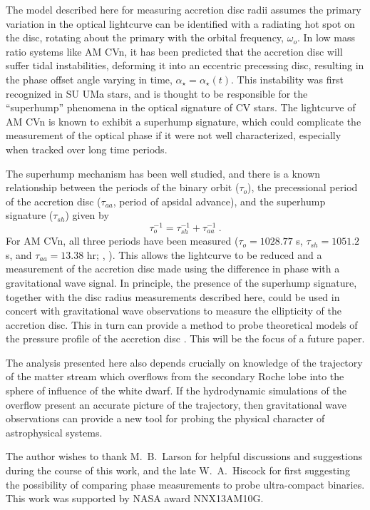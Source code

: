 \documentclass[preprint2]{aastex}
\begin{document}
The model described here for measuring accretion disc radii assumes
the primary variation in the optical lightcurve can be identified
with a radiating hot spot on the disc, rotating about the primary with
the orbital frequency, $\omega_{o}$.  In low mass ratio systems like
AM CVn, it has been predicted that the accretion disc will suffer
tidal instabilities, deforming it into an eccentric precessing disc,
resulting in the phase offset angle varying in time, $\alpha_\star =
\alpha_\star(t)$.  This instability was first recognized in SU UMa stars,
and is thought to be responsible for the ``superhump'' phenomena in
the optical signature of CV stars.  The lightcurve of AM CVn is known
to exhibit a superhump signature, which could complicate the
measurement of the optical phase if it were not well characterized,
especially when tracked over long time periods.

The superhump mechanism has been well studied, and there is a known 
relationship between the periods of the binary orbit ($\tau_{o}$), the 
precessional period of the accretion disc ($\tau_{aa}$, period of 
apsidal advance), and the superhump signature ($\tau_{sh}$) given by
\begin{equation}
    \tau_{o}^{-1} =  \tau_{sh}^{-1} +  \tau_{aa}^{-1} \ .
    \label{PeriodTheory}
\end{equation}
For AM CVn, all three periods have been measured ($\tau_{o} = 1028.77$
s, $\tau_{sh} = 1051.2$ s, and $\tau_{aa} = 13.38$ hr; \citep{PHS},
\citep{1998ApJ...493L.105H}).  This allows the lightcurve to be
reduced and a measurement of the accretion disc made using the
difference in phase with a gravitational wave signal.  In principle,
the presence of the superhump signature, together with the disc radius
measurements described here, could be used in concert with
gravitational wave observations to measure the ellipticity of the
accretion disc.  This in turn can provide a method to probe
theoretical models of the pressure profile of the accretion disc 
\citep{2006MNRAS.368.1123G}.  This will be the focus of a future 
paper.

The analysis presented here also depends crucially on knowledge of the
trajectory of the matter stream which overflows from the secondary
Roche lobe into the sphere of influence of the white dwarf.  If the
hydrodynamic simulations of the overflow present an accurate picture
of the trajectory, then gravitational wave observations can provide a
new tool for probing the physical character of astrophysical systems.

\acknowledgments The author wishes to thank M.\ B.\ Larson for helpful
discussions and suggestions during the course of this work, and the 
late W.\ A.\ Hiscock for first suggesting the possibility of comparing 
phase measurements to probe ultra-compact binaries.  This work was 
supported by NASA award NNX13AM10G.


\end{document}
